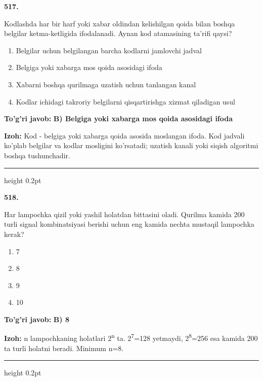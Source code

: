 \documentclass[10pt,a4paper,oneside]{article}
\begin{document}
\noindent\textbf{\color{ink}517.}
\par
Kodlashda har bir harf yoki xabar oldindan kelishilgan qoida bilan boshqa belgilar ketma-ketligida ifodalanadi. Aynan kod atamasining ta'rifi qaysi?
\begin{enumerate}[label=\Alph*),leftmargin=9mm]
\item Belgilar uchun belgilangan barcha kodlarni jamlovchi jadval
\item Belgiga yoki xabarga mos qoida asosidagi ifoda
\item Xabarni boshqa qurilmaga uzatish uchun tanlangan kanal
\item Kodlar ichidagi takroriy belgilarni qisqartirishga xizmat qiladigan usul
\end{enumerate}
\begin{tcolorbox}[enhanced,breakable,colback=teal!4,colframe=teal!50!black,boxrule=0.5pt,arc=1.1mm,left=3mm,right=3mm,top=1.7mm,bottom=1.7mm,before skip=2mm,after skip=2mm]
\textbf{\color{teal}To'g'ri javob:} \textbf{B) Belgiga yoki xabarga mos qoida asosidagi ifoda}
\par\smallskip
\textbf{Izoh:} Kod - belgiga yoki xabarga qoida asosida moslangan ifoda. Kod jadvali ko'plab belgilar va kodlar mosligini ko'rsatadi; uzatish kanali yoki siqish algoritmi boshqa tushunchadir.
\end{tcolorbox}
\vspace{2mm}\hrule height 0.2pt \vspace{3mm}

\noindent\textbf{\color{ink}518.}
\par
Har lampochka qizil yoki yashil holatdan bittasini oladi. Qurilma kamida 200 turli signal kombinatsiyasi berishi uchun eng kamida nechta mustaqil lampochka kerak?
\begin{enumerate}[label=\Alph*),leftmargin=9mm]
\item 7
\item 8
\item 9
\item 10
\end{enumerate}
\begin{tcolorbox}[enhanced,breakable,colback=teal!4,colframe=teal!50!black,boxrule=0.5pt,arc=1.1mm,left=3mm,right=3mm,top=1.7mm,bottom=1.7mm,before skip=2mm,after skip=2mm]
\textbf{\color{teal}To'g'ri javob:} \textbf{B) 8}
\par\smallskip
\textbf{Izoh:} n lampochkaning holatlari 2\textsuperscript{n} ta. 2\textsuperscript{7}=128 yetmaydi, 2\textsuperscript{8}=256 esa kamida 200 ta turli holatni beradi. Minimum n=8.
\end{tcolorbox}
\vspace{2mm}\hrule height 0.2pt \vspace{3mm}
\end{document}
